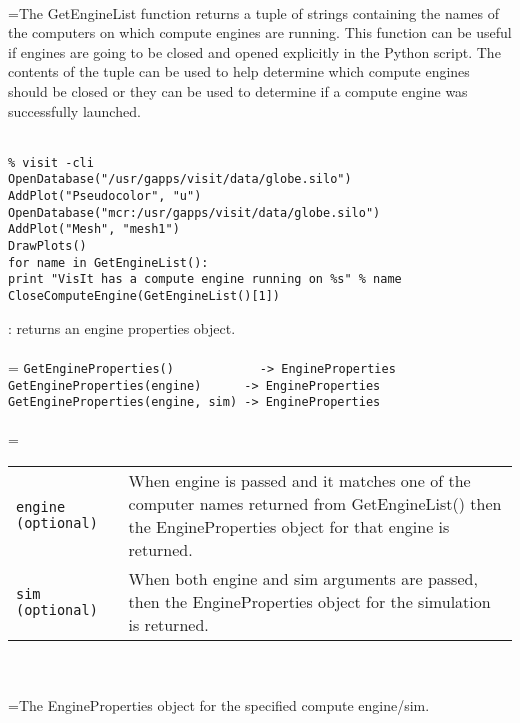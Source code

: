 \documentclass[10pt,a4paper]{report}
\begin{document}
 \\ 
\hangindent=\parindent The GetEngineList function returns a tuple of strings containing the names of the computers on which compute engines are running. This function can be useful if engines are going to be closed and opened explicitly in the Python script. The contents of the tuple can be used to help determine which compute engines should be closed or they can be used to determine if a compute engine was successfully launched. \\[-3mm] 

\\[-6mm]
\begin{verbatim}% visit -cli
OpenDatabase("/usr/gapps/visit/data/globe.silo")
AddPlot("Pseudocolor", "u")
OpenDatabase("mcr:/usr/gapps/visit/data/globe.silo")
AddPlot("Mesh", "mesh1")
DrawPlots()
for name in GetEngineList():
print "VisIt has a compute engine running on %s" % name
CloseComputeEngine(GetEngineList()[1])
\end{verbatim}
\newpage


{}
: returns an engine properties object.\\[-3mm]

 \\ 
\hangindent=\parindent 
\verb!GetEngineProperties()            -> EngineProperties!\\ 
\verb!GetEngineProperties(engine)      -> EngineProperties!\\ 
\verb!GetEngineProperties(engine, sim) -> EngineProperties!\\ [-3mm]

 \\ 
\hangindent=\parindent 
\begin{tabular}{lp{9cm}}
\verb!engine (optional)! & When engine is passed and it matches one of the computer names returned from GetEngineList() then the EngineProperties object for that engine is returned. \\
\verb!sim (optional)! & When both engine and sim arguments are passed, then the EngineProperties object for the simulation is returned. \\
\end{tabular} \\[-2mm]


 \\ 
\hangindent=\parindent The EngineProperties object for the specified compute engine/sim. \\[-3mm] 
\end{document}

